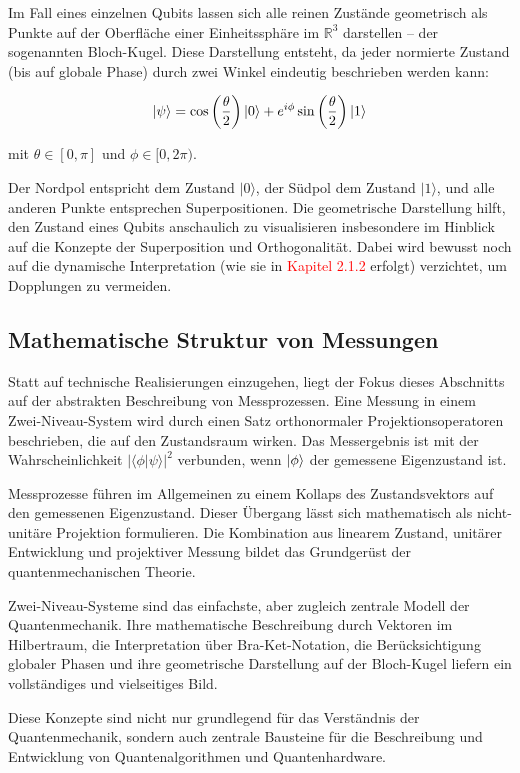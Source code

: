 Im Fall eines einzelnen Qubits lassen sich alle reinen Zustände geometrisch als Punkte auf der Oberfläche einer Einheitssphäre im $\mathbb{R}^3$ darstellen – der sogenannten Bloch-Kugel. Diese Darstellung entsteht, da jeder normierte Zustand (bis auf globale Phase) durch zwei Winkel eindeutig beschrieben werden kann:

\[
|\psi\rangle = \cos\left(\frac{\theta}{2}\right) \ket{0} + e^{i\phi} \sin\left(\frac{\theta}{2}\right) \ket{1}
\]

mit $\theta \in [0, \pi]$ und $\phi \in [0, 2\pi)$.

Der Nordpol entspricht dem Zustand $|0\rangle$, der Südpol dem Zustand $|1\rangle$, und alle anderen Punkte entsprechen Superpositionen. Die geometrische Darstellung hilft, den Zustand eines Qubits anschaulich zu visualisieren insbesondere im Hinblick auf die Konzepte der Superposition und Orthogonalität. Dabei wird bewusst noch auf die dynamische Interpretation (wie sie in \textcolor{red}{Kapitel 2.1.2} erfolgt) verzichtet, um Dopplungen zu vermeiden.

\subsection{Mathematische Struktur von Messungen}

Statt auf technische Realisierungen einzugehen, liegt der Fokus dieses Abschnitts auf der abstrakten Beschreibung von Messprozessen. Eine Messung in einem Zwei-Niveau-System wird durch einen Satz orthonormaler Projektionsoperatoren beschrieben, die auf den Zustandsraum wirken. Das Messergebnis ist mit der Wahrscheinlichkeit $|\langle\phi|\psi\rangle|^2$ verbunden, wenn $\ket{\phi}$ der gemessene Eigenzustand ist.

Messprozesse führen im Allgemeinen zu einem Kollaps des Zustandsvektors auf den gemessenen Eigenzustand. Dieser Übergang lässt sich mathematisch als nicht-unitäre Projektion formulieren. Die Kombination aus linearem Zustand, unitärer Entwicklung und projektiver Messung bildet das Grundgerüst der quantenmechanischen Theorie.


Zwei-Niveau-Systeme sind das einfachste, aber zugleich zentrale Modell der Quantenmechanik. Ihre mathematische Beschreibung durch Vektoren im Hilbertraum, die Interpretation über Bra-Ket-Notation, die Berücksichtigung globaler Phasen und ihre geometrische Darstellung auf der Bloch-Kugel liefern ein vollständiges und vielseitiges Bild.

Diese Konzepte sind nicht nur grundlegend für das Verständnis der Quantenmechanik, sondern auch zentrale Bausteine für die Beschreibung und Entwicklung von Quantenalgorithmen und Quantenhardware.

